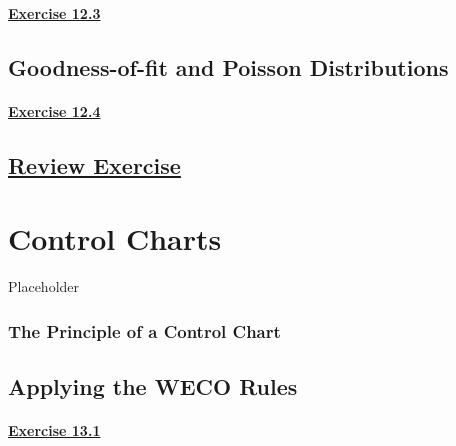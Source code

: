 \documentclass[
  11pt,
]{book}
\begin{document}
\subsubsection*{\texorpdfstring{\hyperref[ex123a]{Exercise 12.3}}{Exercise 12.3}}\label{exercise-12.3}

\section{Goodness-of-fit and Poisson Distributions}\label{goodness-of-fit-and-poisson-distributions}

\subsubsection*{\texorpdfstring{\hyperref[ex124a]{Exercise 12.4}}{Exercise 12.4}}\label{exercise-12.4}

\section*{\texorpdfstring{\hyperref[re12a]{Review Exercise}}{Review Exercise}}\label{review-exercise-11}

\chapter{Control Charts}\label{control-charts}

Placeholder

\subsection*{The Principle of a Control Chart}\label{the-principle-of-a-control-chart}

\section{Applying the WECO Rules}\label{applying-the-weco-rules}

\subsubsection*{\texorpdfstring{\hyperref[ex131a]{Exercise 13.1}}{Exercise 13.1}}\label{exercise-13.1}
\end{document}
